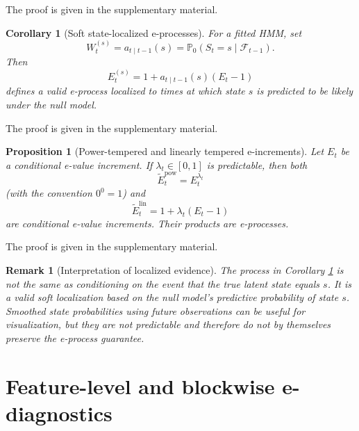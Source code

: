 \documentclass[pdflatex,sn-basic]{sn-jnl}
\theoremstyle{thmstyleone}
\newtheorem{proposition}[theorem]{Proposition}
\newtheorem{corollary}[theorem]{Corollary}
\theoremstyle{thmstyletwo}
\newtheorem{remark}{Remark}
\theoremstyle{thmstylethree}
\newcommand{\Pbb}{\mathbb P}
\newcommand{\1}{\mathbf 1}
\newcommand{\calF}{\mathcal F}
\begin{document}
\noindent The proof is given in the supplementary material.

\begin{corollary}[Soft state-localized e-processes]
\label{cor:state_localized}
For a fitted HMM, set
\begin{equation}
 W_t^{(s)}=a_{t\mid t-1}(s)=\Pbb_0(S_t=s\mid\calF_{t-1}).
\end{equation}
Then
\begin{equation}
 E_t^{(s)}=1+a_{t\mid t-1}(s)(E_t-1)
\end{equation}
defines a valid e-process localized to times at which state $s$ is predicted to be likely under the null model.
\end{corollary}

\noindent The proof is given in the supplementary material.

\begin{proposition}[Power-tempered and linearly tempered e-increments]
\label{prop:tempering}
Let $E_t$ be a conditional e-value increment. If $\lambda_t\in[0,1]$ is predictable, then both
\begin{equation}
 \widetilde E_t^{\mathrm{pow}}=E_t^{\lambda_t}
\end{equation}
(with the convention $0^0=1$) and
\begin{equation}
 \widetilde E_t^{\mathrm{lin}}=1+\lambda_t(E_t-1)
\end{equation}
are conditional e-value increments. Their products are e-processes.
\end{proposition}

\noindent The proof is given in the supplementary material.

\begin{remark}[Interpretation of localized evidence]
The process in Corollary \ref{cor:state_localized} is not the same as conditioning on the event that the true latent state equals $s$. It is a valid soft localization based on the null model's predictive probability of state $s$. Smoothed state probabilities using future observations can be useful for visualization, but they are not predictable and therefore do not by themselves preserve the e-process guarantee.
\end{remark}

\section{Feature-level and blockwise e-diagnostics}
\label{sec:feature_block}
\end{document}
